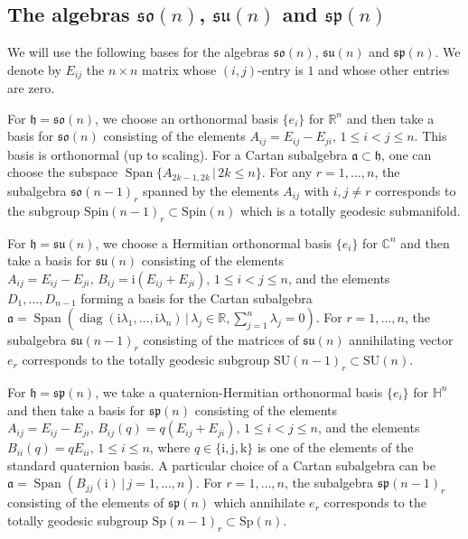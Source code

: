 \documentclass[10pt,a4paper]{amsart}
\newcommand \la{\lambda}
\newcommand \br{\mathbb{R}}
\newcommand \bc{\mathbb{C}}
\newcommand \bh{\mathbb{H}}
\newcommand \Span{\operatorname{Span}}
\newcommand \Sp{\mathrm{Sp}}
\newcommand \SU{\mathrm{SU}}
\newcommand \Spin{\mathrm{Spin}}
\newcommand\ag{\mathfrak a}
\newcommand\h{\mathfrak h}
\newcommand \so{\mathfrak{so}}
\newcommand \spg{\mathfrak{sp}}
\newcommand \su{\mathfrak{su}}
\newcommand \ir{\mathrm{i}}
\newcommand \jr{\mathrm{j}}
\newcommand \kr{\mathrm{k}}
\newcommand \diag{\operatorname{diag}}
\newcommand \<{\langle}
\renewcommand \>{\rangle}
\begin{document}
	\subsection{The algebras \texorpdfstring{$\so(n)$, $\su(n)$ and $\spg(n)$}{so(n), su(n) and sp(n)}}
	\label{ss:algebras}
	
	We will use the following bases for the algebras $\so(n)$, $\su(n)$ and $\spg(n)$. We denote by $E_{ij}$ the $n \times n$ matrix whose $(i,j)$-entry is $1$ and whose other entries are zero.
	
	For $\h = \so(n)$, we choose an orthonormal basis $\{e_i\}$ for $\br^n$ and then take a basis for $\so(n)$ consisting of the elements $A_{ij} = E_{ij} - E_{ji}, \, 1 \le i < j\le n$. This basis is orthonormal (up to scaling). For a Cartan subalgebra $\ag \subset \h$, one can choose the subspace $\Span\{A_{2k-1,2k} \, | \, 2k \le n\}$. For any $r=1, \dots, n$, the subalgebra $\so(n-1)_r$ spanned by the elements $A_{ij}$ with $i,j \ne r$ corresponds to the subgroup $\Spin(n-1)_r \subset \Spin(n)$ which is a totally geodesic submanifold.
	
	For $\h = \su(n)$, we choose a Hermitian orthonormal basis $\{e_i\}$ for $\bc^n$ and then take a basis for $\su(n)$ consisting of the elements $A_{ij} = E_{ij} - E_{ji}, \, B_{ij} = \ir (E_{ij} + E_{ji}), \, 1 \le i < j\le n$, and the elements $D_1, \dots, D_{n-1}$ forming a basis for the Cartan subalgebra $\ag = \Span(\diag(\ir \la_1, \dots, \ir \la_n) \, | \, \la_j \in \br, \sum_{j=1}^{n} \la_j = 0)$. For $r=1, \dots, n$, the subalgebra $\su(n-1)_r$ consisting of the matrices of $\su(n)$ annihilating vector $e_r$ corresponds to the totally geodesic subgroup $\SU(n-1)_r \subset \SU(n)$.
	
	For $\h = \spg(n)$, we take a quaternion-Hermitian orthonormal basis $\{e_i\}$ for $\bh^n$ and then take a basis for $\spg(n)$ consisting of the elements $A_{ij} = E_{ij} - E_{ji}, \, B_{ij}(q) = q (E_{ij} + E_{ji}), \, 1 \le i < j \le n$, and the elements $B_{ii}(q) = q E_{ii}, \, 1 \le i \le n$, where $q \in \{\ir,\jr,\kr\}$ is one of the elements of the standard quaternion basis. A particular choice of a Cartan subalgebra can be $\ag = \Span(B_{jj}(\ir) \, | \, j =  1, \dots, n)$. For $r=1, \dots, n$, the subalgebra $\spg(n-1)_r$ consisting of the elements of $\spg(n)$ which annihilate $e_r$ corresponds to the totally geodesic subgroup $\Sp(n-1)_r \subset \Sp(n)$.
	
\end{document}

